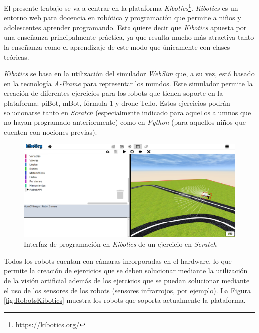 El presente trabajo se va a centrar en la plataforma \textit{Kibotics}\footnote{https://kibotics.org/}. \textit{Kibotics} es un entorno web para docencia en robótica y programación que permite a niños y adolescentes aprender programando. Esto quiere decir que \textit{Kibotics}  apuesta por una enseñanza principalmente práctica, ya que resulta mucho más atractiva tanto la enseñanza como el aprendizaje de este modo que únicamente con clases teóricas. \newline

\textit{Kibotics}  se basa en la utilización del simulador \textit{WebSim}  que, a su vez, está basado en la tecnología \textit{A-Frame}  para representar los mundos. Este simulador permite la creación de diferentes ejercicios para los robots que tienen soporte en la plataforma: piBot, mBot, fórmula 1 y drone Tello. Estos ejercicios podrán solucionarse tanto en \textit{Scratch} (especialmente indicado para aquellos alumnos que no hayan programado anteriormente) como en \textit{Python} (para aquellos niños que cuenten con nociones previas). \newline

\begin{figure}[h!]
    \centering
    \includegraphics[scale=0.5]{kibotics.PNG}
    \caption{Interfaz de programación en \textit{Kibotics} de un ejercicio en \textit{Scratch}}
    \label{fig:kibotics}
\end{figure}


Todos los robots cuentan con cámaras incorporadas en el hardware, lo que permite la creación de ejercicios que se deben solucionar mediante la utilización de la visión artificial además de los ejercicios que se puedan solucionar mediante el uso de los sensores de los robots (sensores infrarrojos, por ejemplo). La Figura \ref{fig:RobotsKibotics} muestra los robots que soporta actualmente la plataforma.\newline


